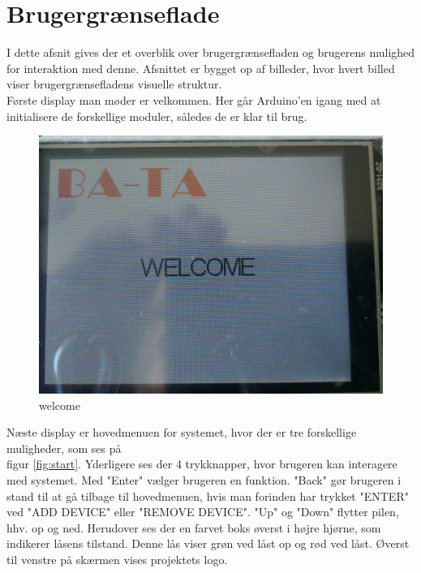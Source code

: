 \graphicspath{{Chapters/Userinterface/}}


\section{Brugergrænseflade}
I dette afsnit gives der et overblik over brugergrænsefladen og brugerens mulighed for interaktion med denne. Afsnittet er bygget op af billeder, hvor hvert billed viser brugergrænsefladens visuelle struktur. \\

Første display man møder er velkommen. Her går Arduino'en igang med at initialisere de forskellige moduler, således de er klar til brug.
\begin{figure}[H]
	\centering
	\includegraphics[width = 300 pt]{Img/welcome.jpg}
	\caption{welcome}
	\label{fig:welcome}
\end{figure}
Næste display er hovedmenuen for systemet, hvor der er tre forskellige muligheder, som ses på \\figur     \ref{fig:start}. Yderligere ses der 4 trykknapper, hvor brugeren kan interagere med systemet. Med "Enter" vælger brugeren en funktion. "Back" gør brugeren i stand til at gå tilbage til hovedmenuen, hvis man forinden har trykket "ENTER" ved "ADD DEVICE" eller "REMOVE DEVICE". "Up" og "Down" flytter pilen, hhv. op og ned. Herudover ses der en farvet boks øverst i højre hjørne, som indikerer låsens tilstand. Denne lås viser grøn ved låst op og rød ved låst. Øverst til venstre på skærmen vises projektets logo.    
